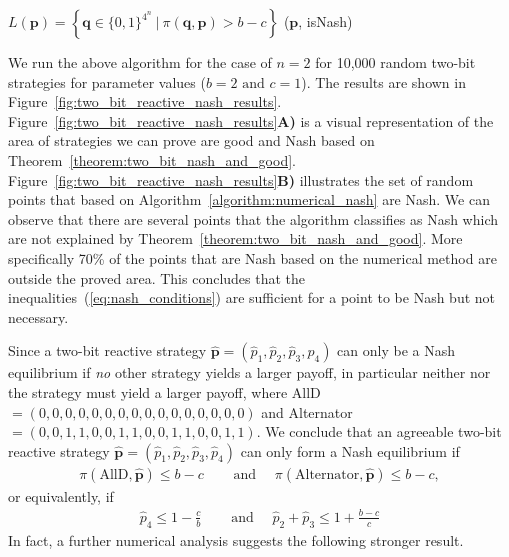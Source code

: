 \documentclass{article}
\theoremstyle{definition}
\begin{document}
\begin{algorithm}[H]
   $L(\mathbf{p}) = \left\{\mathbf{q} \in \{0, 1\}^{4 ^ n} ~\big|~ \pi({\mathbf{q}}, \mathbf{p}) > b\!-\!c \right\}$\;
  \Return (\(\mathbf{p}\), isNash) \;
  \caption{Numerical evaluation for Nash.}\label{algorithm:numerical_nash}
\end{algorithm}

We run the above algorithm for the case of \(n=2\) for 10,000 random two-bit strategies for
parameter values (\(b=2 \text{ and } c=1\)). The results are shown in
Figure~\ref{fig:two_bit_reactive_nash_results}.
Figure~\ref{fig:two_bit_reactive_nash_results}\textbf{A)} is a visual
representation of the area of strategies we can prove are good and Nash based on
Theorem~\ref{theorem:two_bit_nash_and_good}.
Figure~\ref{fig:two_bit_reactive_nash_results}\textbf{B)} illustrates the set of
random points that based on Algorithm~\ref{algorithm:numerical_nash} are Nash.
We can observe that there are several points that the algorithm classifies as
Nash which are not explained by Theorem~\ref{theorem:two_bit_nash_and_good}.
More specifically 70\% of the points that are Nash based on the numerical method
are outside the proved area. This concludes that the
inequalities~(\ref{eq:nash_conditions}) are sufficient for a point to be Nash
but not necessary.

Since a two-bit reactive strategy \(\mathbf{\hat{p}} = (\hat{p}_{1},
\hat{p}_{2}, \hat{p}_{3}, \hat{p}_{4})\) can only be a Nash equilibrium if {\it no} other strategy yields a larger payoff,  in particular neither  nor the  strategy must yield a larger payoff, where
AllD\(=(0, 0, 0, 0, 0, 0, 0, 0, 0, 0, 0, 0, 0, 0, 0, 0)\) and
Alternator\(=(0, 0, 1, 1, 0, 0, 1, 1, 0, 0, 1, 1, 0, 0, 1, 1)\). 
We conclude that an agreeable two-bit reactive strategy  \(\mathbf{\hat{p}} = (\hat{p}_{1}, \hat{p}_{2}, \hat{p}_{3}, \hat{p}_{4})\) can only form a Nash equilibrium if 
\begin{align*}
\pi(\text{AllD}, \mathbf{\hat{p}}) \leq b\!-\!c & \quad \text{ and } \quad \pi(\text{Alternator}, \mathbf{\hat{p}}) \leq b\!-\!c,
\end{align*}
or equivalently, if
\begin{align}\label{Eq:NashConditionDonationGame}
  \hat{p}_4 \leq 1 \!- \!\frac{c}{b} & \quad \text{ and } \quad  \hat{p}_2 + \hat{p}_3 \leq 1 + \frac{b\!-\!c}{c}
\end{align}
In fact, a further numerical analysis suggests the following stronger result. 
\end{document}
